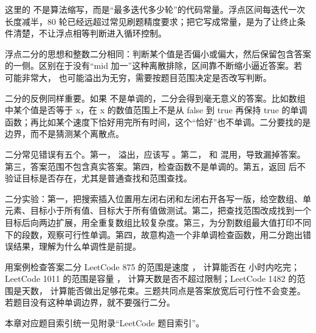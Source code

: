 这里的  不是算法缩写，而是“最多迭代多少轮”的代码常量。浮点区间每迭代一次长度减半，80 轮已经远超过常见刷题精度要求；把它写成常量，是为了让终止条件清楚，不让浮点相等判断进入循环控制。

浮点二分的思想和整数二分相同：判断某个值是否偏小或偏大，然后保留包含答案的一侧。区别在于没有“mid 加一”这种离散排除，区间靠不断缩小逼近答案。若  可能非常大， 也可能溢出为无穷，需要按题目范围决定是否改写判断。

二分的反例同样重要。如果  不是单调的，二分会得到毫无意义的答案。比如数组中某个值是否等于 x，在 x 的数值范围上不是从 false 到 true 再保持 true 的单调函数；再比如某个速度下恰好用完所有时间，这个“恰好”也不单调。二分要找的是边界，而不是猜测某个离散点。

\begin{warningbox}
二分常见错误有五个。第一， 溢出，应该写 。第二， 和  混用，导致漏掉答案。第三，答案范围不包含真实答案。第四，检查函数不是单调的。第五，返回  后不验证目标是否存在，尤其是普通查找和范围查找。
\end{warningbox}

\begin{labbox}
二分实验：第一，把搜索插入位置用左闭右闭和左闭右开各写一版，给空数组、单元素、目标小于所有值、目标大于所有值做测试。第二，把查找范围改成找到一个目标后向两边扩展，用全重复数组比较复杂度。第三，为分割数组最大值打印不同  下的段数，观察可行性单调。第四，故意构造一个非单调检查函数，用二分跑出错误结果，理解为什么单调性是前提。
\end{labbox}

\begin{principlebox}{用案例检查答案二分}
LeetCode 875 的范围是速度 ， 计算能否在  小时内吃完；LeetCode 1011 的范围是容量 ， 计算天数是否不超过限制；LeetCode 1482 的范围是天数， 计算能否做出足够花束。三题共同点是答案放宽后可行性不会变差。若题目没有这种单调边界，就不要强行二分。
\end{principlebox}

本章对应题目索引统一见附录“LeetCode 题目索引”。





